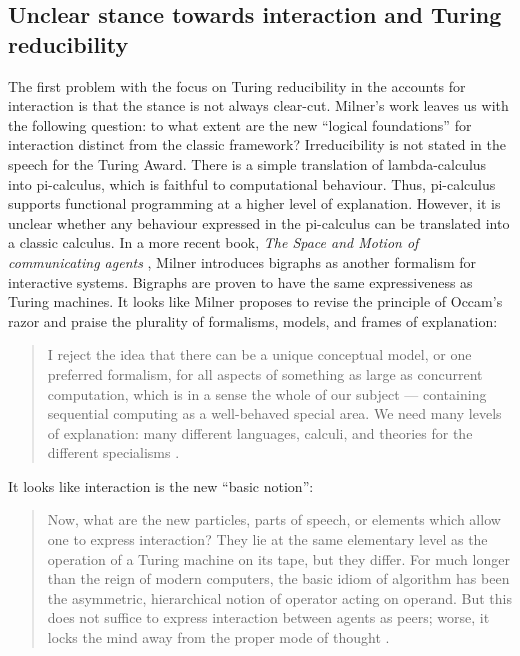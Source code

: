 \documentclass[a4paper, 11pt, twoside]{article}
\begin{document}
\subsection{Unclear stance towards interaction and Turing reducibility} 

The first problem with the focus on Turing reducibility in the accounts for interaction is that the stance is not always clear-cut. 
Milner’s work leaves us with the following question: to what extent are the new ``logical foundations'' for interaction distinct from the classic framework? Irreducibility is not stated in the speech for the Turing Award. There is a simple translation of lambda-calculus into pi-calculus, which is faithful to computational behaviour. Thus, pi-calculus supports functional programming at a higher level of explanation. However, it is unclear whether any behaviour expressed in the pi-calculus can be translated into a classic calculus. In a more recent book, \textit{The Space and Motion of communicating agents} \parencite*{Milner2009}, Milner introduces bigraphs as another formalism for interactive systems. Bigraphs are proven to have the same expressiveness as Turing machines. It looks like Milner proposes to revise the principle of Occam’s razor and praise the plurality of formalisms, models, and frames of explanation: 

\begin{quote}
I reject the idea that there can be a unique conceptual model, or one preferred formalism, for all aspects of something as large as concurrent computation, which is in a sense the whole of our subject — containing sequential computing as a well-behaved special area. We need many levels of explanation: many different languages, calculi, and theories for the different specialisms \parencite{Milner1993}.
\end{quote}

\noindent It looks like interaction is the new ``basic notion'': 

\begin{quote}
Now, what are the new particles, parts of speech, or elements which allow one to express interaction? They lie at the same elementary level as the operation of a Turing machine on its tape, but they differ. For much longer than the reign of modern computers, the basic idiom of algorithm has been the asymmetric, hierarchical notion of operator acting on operand. But this does not suffice to express interaction between agents as peers; worse, it locks the mind away from the proper mode of thought \parencite{Milner2006}.
\end{quote}
\end{document}
